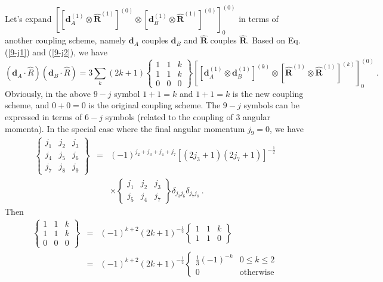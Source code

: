 Let's expand $\left[ \left[ \mathbf{d}_{A}^{(1)} \otimes \mathbf{\hat{R}}^{(1)} \right]^{(0)}\otimes \left[ \mathbf{d}_{B}^{(1)} \otimes \mathbf{\hat{R}}^{(1)} \right]^{(0)}  \right]_{0}^{(0)}$ in terms of another coupling scheme, namely $\mathbf{d}_{A}$ couples $\mathbf{d}_{B}$ and $\mathbf{\hat{R}}$ couples $\mathbf{\hat{R}}$. Based on Eq. (\ref{9-j1}) and (\ref{9-j2}), we have
\begin{equation}
(\mathbf{d}_{A}\cdot\hat{R})(\mathbf{d}_{B}\cdot\hat{R})= 3\sum_{k}(2k + 1) 
\left\{
\begin{array}{ccc}
1& 1&k \\
1&1&k \\
0&0&0 
\end{array}
\right\} 
\left[ \left[ \mathbf{d}_{A}^{(1)} \otimes \mathbf{d}_{B}^{(1)} \right]^{(k)}\otimes \left[ \mathbf{\hat{R}}^{(1)} \otimes \mathbf{\hat{R}}^{(1)} \right]^{(k)}  \right]_{0}^{(0)} \ . \label{regrouping}
\end{equation}
Obviously, in the above $9-j$ symbol $1+1=k$ and $1+1=k$ is the new coupling scheme, and $0+0=0$ is the original coupling scheme. The $9-j$ symbols can be expressed in terms of $6-j$ symbols (related to the coupling of 3 angular momenta). In the special case where the final angular momentum $j_{9}=0$, we have
\begin{eqnarray}
\left\{
\begin{array}{ccc}
j_{1}& j_{2}&j_{3} \\
j_{4}&j_{5}&j_{6} \\
j_{7}&j_{8}&j_{9}
\end{array}
\right\} 
&=&(-1)^{j_{2} + j_{3} + j_{4} + j_{7}}[(2j_{3} +1)(2j_{7} + 1)]^{-\frac{1}{2}} \nonumber \\
&  & \times 
\left\{
\begin{array}{ccc}
j_{1}& j_{2}&j_{3} \\
j_{5}&j_{4}&j_{7} 
\end{array}
\right\} 
\delta_{j_{3}j_{6}}\delta_{j_{7}j_{8}} \ . 
\end{eqnarray}
Then
\begin{eqnarray}
\left\{
\begin{array}{ccc}
1& 1&k \\
1&1&k \\
0&0&0 
\end{array}
\right\} 
&=& (-1)^{k+2} (2k+1)^{-\frac{1}{2}}
\left\{
\begin{array}{ccc}
1& 1&k \\
1&1&0 
\end{array}
\right\} \nonumber \\
&=& (-1)^{k+2} (2k+1)^{-\frac{1}{2}} 
\left\{ 
\begin{array}{cc}
\frac{1}{3} (-1)^{-k} & 0\leq k \leq 2 \\
0 & \mbox{otherwise}
\end{array}
\right.
\end{eqnarray}

